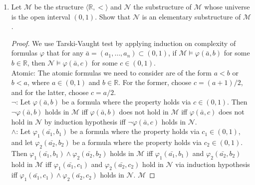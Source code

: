 \documentclass{article}
\begin{document}
\begin{enumerate}
\begin{enumerate}
\begin{proof}
          For each $n\in\mathbb{N}\setminus\{0,1\}$, $S_n$ is unique,
          hence we have infinitely many minimal definable and infinite
          subsets $S_n$.
        \end{proof}
    \end{enumerate}

  \item Let $\mathcal{M}$ be the structure
    $\langle\mathbb{R},<\rangle$ and $\mathcal{N}$ the substructure of
    $\mathcal{M}$ whose universe is the open interval $(0,1)$. Show
    that $\mathcal{N}$ is an elementary substructure of $\mathcal{M}$.

    \begin{proof}
      We use Tarski-Vaught test by applying induction on complexity of
      formulas $\varphi$ that for any
      $\bar{a}=(a_1,\ldots,a_n)\subset(0,1)$, if
      $\mathcal{M}\models\varphi(\bar{a},b)$ for some $b\in\mathbb{R}$,
      then $\mathcal{N}\models\varphi(\bar{a},c)$ for some $c\in(0,1)$. \\

      Atomic: The atomic formulas we need to consider are of the
      form $a<b$ or $b<a$, where $a\in(0,1)$ and $b\in\mathbb{R}$. For the
      former, choose $c=(a+1)/2$, and for the latter, choose $c=a/2$. \\

      $\neg$: Let $\varphi(\bar{a},b)$ be a formula where the property
      holds via $c\in(0,1)$. Then $\neg\varphi(\bar{a},b)$ holds in
      $\mathcal{M}$ iff $\varphi(\bar{a},b)$ does not hold in $\mathcal{M}$
      iff $\varphi(\bar{a},c)$ does not hold in $\mathcal{N}$ by induction
      hypothesis iff $\neg\varphi(\bar{a},c)$ holds in $\mathcal{N}$. \\

      $\wedge$: Let $\varphi_1(\bar{a_1},b_1)$ be a formula where the
      property holds via $c_1\in(0,1)$, and let $\varphi_2(\bar{a_2},b_2)$
      be a formula where the property holds via $c_2\in(0,1)$. Then
      $\varphi_1(\bar{a_1},b_1)\wedge\varphi_2(\bar{a_2},b_2)$ holds in
      $\mathcal{M}$ iff $\varphi_1(\bar{a_1},b_1)$ and
      $\varphi_2(\bar{a_2},b_2)$ hold in $\mathcal{M}$ iff
      $\varphi_1(\bar{a_1},c_1)$ and $\varphi_2(\bar{a_2},c_2)$ hold in
      $\mathcal{N}$ via induction hypothesis iff
      $\varphi_1(\bar{a_1},c_1)\wedge\varphi_2(\bar{a_2},c_2)$ holds in
      $\mathcal{N}$.
      $\mathcal{M}$
    \end{proof}


\end{enumerate}
\end{document}
